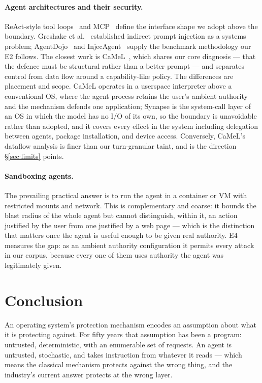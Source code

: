 \documentclass[11pt]{article}
\newcommand{\syn}{Synapse}
\begin{document}
\paragraph{Agent architectures and their security.} ReAct-style tool
loops~\cite{yao2023react,schick2023toolformer} and MCP~\cite{mcp2024} define
the interface shape we adopt above the boundary. Greshake et
al.~\cite{greshake2023injection} established indirect prompt injection as a
systems problem; AgentDojo~\cite{debenedetti2024agentdojo} and
InjecAgent~\cite{zhan2024injecagent} supply the benchmark methodology our E2
follows. The closest work is CaMeL~\cite{debenedetti2025camel}, which shares
our core diagnosis --- that the defence must be structural rather than a better
prompt --- and separates control from data flow around a capability-like
policy. The differences are placement and scope. CaMeL operates in a userspace
interpreter above a conventional OS, where the agent process retains the
user's ambient authority and the mechanism defends one application; \syn{} is
the system-call layer of an OS in which the model has no I/O of its own, so
the boundary is unavoidable rather than adopted, and it covers every effect in
the system including delegation between agents, package installation, and
device access. Conversely, CaMeL's dataflow analysis is finer than our
turn-granular taint, and is the direction \S\ref{sec:limits} points.

\paragraph{Sandboxing agents.} The prevailing practical answer is to run the
agent in a container or VM with restricted mounts and network. This is
complementary and coarse: it bounds the blast radius of the whole agent but
cannot distinguish, within it, an action justified by the user from one
justified by a web page --- which is the distinction that matters once the agent
is useful enough to be given real authority. E4 measures the gap: as an ambient
authority configuration it permits every attack in our corpus, because every one
of them uses authority the agent was legitimately given.

\section{Conclusion}

An operating system's protection mechanism encodes an assumption about what it
is protecting against. For fifty years that assumption has been a program:
untrusted, deterministic, with an enumerable set of requests. An agent is
untrusted, stochastic, and takes instruction from whatever it reads --- which
means the classical mechanism protects against the wrong thing, and the
industry's current answer protects at the wrong layer.
\end{document}
